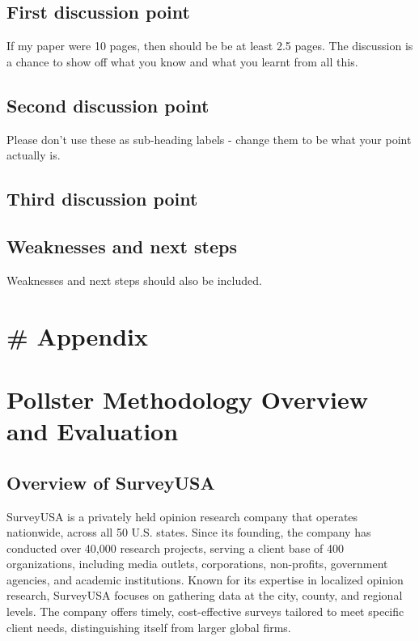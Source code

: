 \documentclass[
  letterpaper,
  DIV=11,
  numbers=noendperiod]{scrartcl}
\begin{document}
\subsection{First discussion point}\label{sec-first-point}

If my paper were 10 pages, then should be be at least 2.5 pages. The
discussion is a chance to show off what you know and what you learnt
from all this.

\subsection{Second discussion point}\label{second-discussion-point}

Please don't use these as sub-heading labels - change them to be what
your point actually is.

\subsection{Third discussion point}\label{third-discussion-point}

\subsection{Weaknesses and next steps}\label{weaknesses-and-next-steps}

Weaknesses and next steps should also be included.

\newpage

\appendix

\section*{\# Appendix}\label{appendix}

\section{Pollster Methodology Overview and
Evaluation}\label{pollster-methodology-overview-and-evaluation}

\subsection{\texorpdfstring{Overview of SurveyUSA\\
}{Overview of SurveyUSA }}\label{overview-of-surveyusa}

SurveyUSA is a privately held opinion research company that operates
nationwide, across all 50 U.S. states. Since its founding, the company
has conducted over 40,000 research projects, serving a client base of
400 organizations, including media outlets, corporations, non-profits,
government agencies, and academic institutions. Known for its expertise
in localized opinion research, SurveyUSA focuses on gathering data at
the city, county, and regional levels. The company offers timely,
cost-effective surveys tailored to meet specific client needs,
distinguishing itself from larger global firms.
\end{document}

